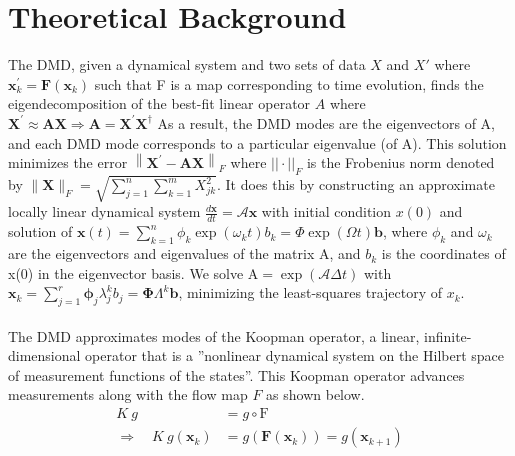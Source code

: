 \documentclass{article}
\begin{document}
\section*{\fontsize{19}{15}\selectfont Theoretical Background}
	The DMD, given a dynamical system and two sets of data $X$ and $X'$ where $\mathbf{x}_{k}^{\prime}=\mathbf{F}\left(\mathbf{x}_{k}\right)$ such that F is a map corresponding to time evolution, finds the eigendecomposition of the best-fit linear operator $A$ where $\mathbf{X}^{\prime} \approx \mathbf{A X} \Rightarrow \mathbf{A}=\mathbf{X}^{\prime} \mathbf{X}^{\dagger}$ As a result, the DMD modes are the eigenvectors of A, and each DMD mode corresponds to a particular eigenvalue (of A). This solution minimizes the error $\left\|\mathbf{X}^{\prime}-\mathbf{A} \mathbf{X}\right\|_{F}$ where $||\cdot||_F$ is the Frobenius norm denoted by $\|\mathbf{X}\|_{F}=\sqrt{\sum_{j=1}^{n} \sum_{k=1}^{m} X_{j k}^{2}}$. It does this by constructing an approximate locally linear dynamical system $\frac{d \mathbf{x}}{d t}=\mathcal{A} \mathbf{x}$ with initial condition $x(0)$ and solution of $\mathbf{x}(t)=\sum_{k=1}^{n} \phi_{k} \exp \left(\omega_{k} t\right) b_{k}=\Phi \exp (\Omega t) \mathbf{b}$, where $\phi_k$ and $\omega_k$ are the eigenvectors and eigenvalues of the matrix A, and $b_k$ is the coordinates of x(0) in the eigenvector basis. We solve  $\mathrm{A}=\exp (\mathcal{A} \Delta t)$ with $\mathbf{x}_{k}=\sum_{j=1}^{r} \boldsymbol{\phi}_{j} \lambda_{j}^{k} b_{j}=\boldsymbol{\Phi} \Lambda^{k} \mathbf{b}$, minimizing the least-squares trajectory of $x_k$. \\ \\
	The DMD approximates modes of the Koopman operator, a linear, infinite-dimensional operator that is a ''nonlinear dynamical system on the Hilbert space of measurement functions of the states''. This Koopman operator advances measurements along with the flow map $F$ as shown below. 
\begin{align*}
K\ g &=g \circ \mathrm{F} \\ 
\Longrightarrow \quad K\ g\left(\mathbf{x}_{k}\right) &=g\left(\mathbf{F}\left(\mathbf{x}_{k}\right)\right)=g\left(\mathbf{x}_{k+1}\right)
\end{align*}
\end{document}
